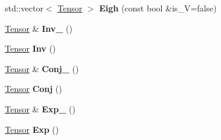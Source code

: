 \begin{DoxyCompactItemize}
\mbox{\label{classcytnx_1_1Tensor_ac456006e0fbd6108dddc520e4ad12ff7}} 
std\+::vector$<$ \hyperlink{classcytnx_1_1Tensor}{Tensor} $>$ {\bfseries Eigh} (const bool \&is\+\_\+V=false)
\item 
\mbox{\label{classcytnx_1_1Tensor_ad21dcb7ba06d23c78ee5fd4e9266a462}} 
\hyperlink{classcytnx_1_1Tensor}{Tensor} \& {\bfseries Inv\+\_\+} ()
\item 
\mbox{\label{classcytnx_1_1Tensor_a7ed6193e29219ff1a2ca2ca95b8b5969}} 
\hyperlink{classcytnx_1_1Tensor}{Tensor} {\bfseries Inv} ()
\item 
\mbox{\label{classcytnx_1_1Tensor_a9312d8faf3fdc8ffe5a7687f88986a1e}} 
\hyperlink{classcytnx_1_1Tensor}{Tensor} \& {\bfseries Conj\+\_\+} ()
\item 
\mbox{\label{classcytnx_1_1Tensor_acf65f5c4d143eb165f7161e58a06b7e4}} 
\hyperlink{classcytnx_1_1Tensor}{Tensor} {\bfseries Conj} ()
\item 
\mbox{\label{classcytnx_1_1Tensor_a4ebfd2713960db958ddb23c4e06c17c4}} 
\hyperlink{classcytnx_1_1Tensor}{Tensor} \& {\bfseries Exp\+\_\+} ()
\item 
\mbox{\label{classcytnx_1_1Tensor_aca1b7e9ae53b3529a7f79b24991c9373}} 
\hyperlink{classcytnx_1_1Tensor}{Tensor} {\bfseries Exp} ()
\end{DoxyCompactItemize}
\textbf{ }\par
